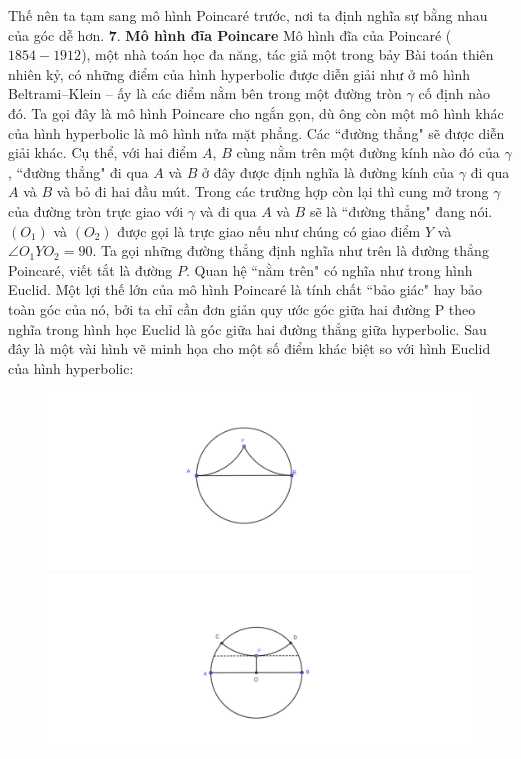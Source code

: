 \begin{multicols}{2}
	Thế nên ta tạm sang mô hình Poincaré trước, nơi ta định nghĩa sự bằng nhau của góc dễ hơn.
	\vskip 0.1cm
	$\pmb{7.}$ \textbf{\color{lichsutoanhoc}Mô hình đĩa Poincare}
	\vskip 0.1cm
	Mô hình đĩa của Poincaré ($1854 - 1912$), một nhà toán học đa năng, tác giả một trong bảy Bài toán thiên nhiên kỷ, có những điểm của hình hyperbolic được diễn giải như ở mô hình Beltrami--Klein -- ấy là các điểm nằm bên trong một đường tròn $\gamma $ cố định nào đó. Ta gọi đây là mô hình Poincare cho ngắn gọn, dù ông còn một mô hình khác của hình hyperbolic là mô hình nửa mặt phẳng. 
	Các ``đường thẳng" sẽ được diễn giải khác. Cụ thể, với hai điểm $A$, $B$ cùng nằm trên một đường kính nào đó của $\gamma$, ``đường thẳng" đi qua $A$ và $B$ ở đây được định nghĩa là đường kính của $\gamma$ đi qua $A$ và $B$ và bỏ đi hai đầu mút. Trong các trường hợp còn lại thì cung mở trong $\gamma$ của đường tròn trực giao với $\gamma$ và đi qua $A$ và $B$ sẽ là ``đường thẳng" đang nói. $(O_1)$ và $(O_2)$ được gọi là trực giao nếu như chúng có giao điểm $Y$ và $ \angle O_1YO_2 = 90$. Ta gọi những đường thẳng định nghĩa như trên là đường thẳng Poincaré, viết tắt là đường $P$. 
	Quan hệ ``nằm trên" có nghĩa như trong hình Euclid. Một lợi thế lớn của mô hình Poincaré là tính chất ``bảo giác" hay bảo toàn góc của nó, bởi ta chỉ cần đơn giản quy ước góc giữa hai đường P theo nghĩa trong hình học Euclid là góc giữa hai đường thẳng giữa hyperbolic.
	Sau đây là một vài hình vẽ minh họa cho một số điểm khác biệt so với hình Euclid của hình hyperbolic:
	\begin{figure}[H]
		\vspace*{-5pt}
		\centering
		\captionsetup{labelformat= empty, justification=centering}
		\includegraphics[width= 1\linewidth]{Đường song song giới hạn Poincare.pdf}
		\includegraphics[width= 1\linewidth]{Đường song song phân kỳ.pdf}

\end{figure}
\end{multicols}
